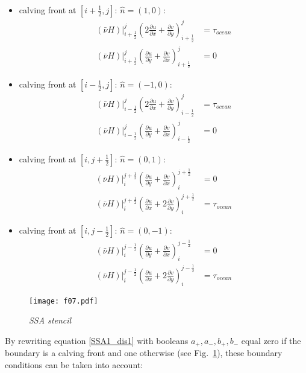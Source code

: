 \documentclass[a4paper,10pt]{article}
\begin{document}
\begin{itemize}
\item calving front at $[i+\frac{1}{2},j]$: $\hat{n}=(1,0)$:
\begin{align}
(\bar{\nu} H)|_{i+\frac{1}{2}}^j\left(2\frac{\partial u}{\partial x} + \frac{\partial v}{\partial y} \right)_{i+\frac{1}{2}}^j &= \tau_{ocean} \nonumber \\
(\bar{\nu} H)|_{i+\frac{1}{2}}^j\left(\frac{\partial u}{\partial y} + \frac{\partial v}{\partial x} \right)_{i+\frac{1}{2}}^j &= 0
\end{align}
\item calving front at $[i-\frac{1}{2},j]$: $\hat{n}=(-1,0)$:
\begin{align}
(\bar{\nu} H)|_{i-\frac{1}{2}}^j\left(2\frac{\partial u}{\partial x} + \frac{\partial v}{\partial y} \right)_{i-\frac{1}{2}}^j &= \tau_{ocean} \nonumber \\
(\bar{\nu} H)|_{i-\frac{1}{2}}^j\left(\frac{\partial u}{\partial y} + \frac{\partial v}{\partial x} \right)_{i-\frac{1}{2}}^j &= 0
\end{align}
\item calving front at $[i,j+\frac{1}{2}]$: $\hat{n}=(0,1)$:
\begin{align}
(\bar{\nu} H)|_{i}^{j+\frac{1}{2}}\left(\frac{\partial u}{\partial y} + \frac{\partial v}{\partial x} \right)_{i}^{j+\frac{1}{2}} &= 0 \nonumber \\
(\bar{\nu} H)|_{i}^{j+\frac{1}{2}}\left(\frac{\partial u}{\partial x} + 2\frac{\partial v}{\partial y} \right)_{i}^{j+\frac{1}{2}} &= \tau_{ocean}
\end{align}
\item calving front at $[i,j-\frac{1}{2}]$: $\hat{n}=(0,-1)$:
\begin{align}
(\bar{\nu} H)|_{i}^{j-\frac{1}{2}}\left(\frac{\partial u}{\partial y} + \frac{\partial v}{\partial x} \right)_{i}^{j-\frac{1}{2}} &= 0 \nonumber \\
(\bar{\nu} H)|_{i}^{j-\frac{1}{2}}\left(\frac{\partial u}{\partial x} + 2\frac{\partial v}{\partial y} \right)_{i}^{j-\frac{1}{2}} &= \tau_{ocean}
\end{align}
\end{itemize}
\begin{figure}[htb]
\begin{center}
\texttt{[image: f07.pdf]}
\caption{\emph{SSA stencil}}
\label{result3}
\end{center}
\end{figure}
By rewriting equation \eqref{SSA1_dis1} with booleans $a_+, a_-, b_+, b_-$ equal zero if the boundary is a calving front and one otherwise (see Fig.~\ref{result3}), these boundary conditions can be taken into account:
\end{document}
